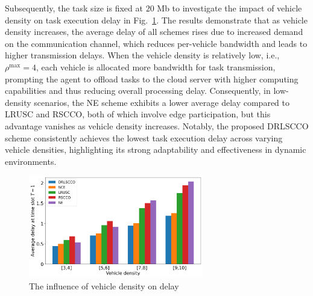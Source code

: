 \documentclass[lettersize,journal]{IEEEtran}
\begin{document}
Subsequently, the task size is fixed at $20$ Mb to investigate the impact of vehicle density on task execution delay in Fig.~\ref{fig: vehicle density v delay}.  
The results demonstrate that as vehicle density increases, the average delay of all schemes rises due to increased demand on the communication channel, which reduces per-vehicle bandwidth and leads to higher transmission delays.
When the vehicle density is relatively low, i.e.,  $ \rho^{\max} = 4 $, each vehicle is allocated more bandwidth for task transmission, prompting the agent to offload tasks to the cloud server with higher computing capabilities and thus reducing overall processing delay. Consequently, in low-density scenarios, the NE scheme exhibits a lower average delay compared to LRUSC and RSCCO, both of which involve edge participation, but this advantage vanishes as vehicle density increases.
Notably, the proposed DRLSCCO scheme consistently achieves the lowest task execution delay across varying vehicle densities, highlighting its strong adaptability and effectiveness in dynamic environments.
\begin{figure}[h]
	\centering
	\includegraphics[width=3in]{vehicle_density.png}
	\caption{The influence of vehicle density on delay}
	\label{fig: vehicle density v delay}
\end{figure}
\end{document}
